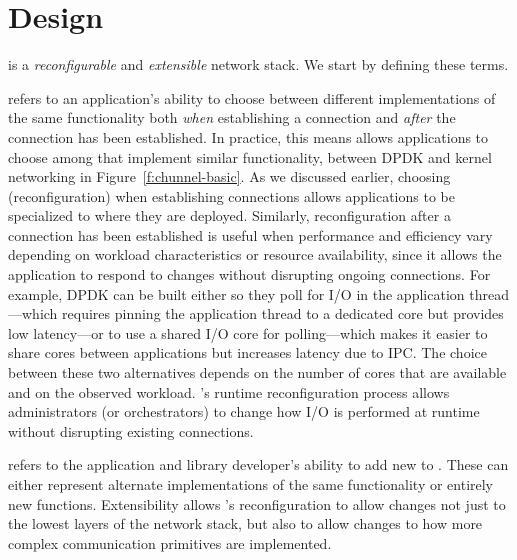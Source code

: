\section{\name Design}\label{sec:design}\label{s:design}
\name is a \emph{reconfigurable} and \emph{extensible} network stack. We start by defining these terms.

 refers to an application's ability to choose between different implementations of the same functionality both \emph{when} establishing a connection and \emph{after} the connection has been established. In practice, this means \name allows applications to choose among \tunnels that implement similar functionality, \eg between DPDK and kernel networking in Figure~\ref{f:chunnel-basic}. As we discussed earlier, choosing \tunnels (\ie reconfiguration) when establishing connections allows applications to be specialized to where they are deployed. Similarly, reconfiguration after a connection has been established is useful when \tunnel performance and efficiency vary depending on workload characteristics or resource availability, since it allows the application to respond to changes without disrupting ongoing connections. For example, DPDK \tunnels can be built either so they poll for I/O in the application thread---which requires pinning the application thread to a dedicated core but provides low latency---or to use a shared I/O core for polling---which makes it easier to share cores between applications but increases latency due to IPC. The choice between these two alternatives depends on the number of cores that are available and on the observed workload. \name's runtime reconfiguration process allows administrators (or orchestrators) to change how I/O is performed at runtime without disrupting existing connections.



 refers to the application and library developer's ability to add new \tunnels to \name. These \tunnels can either represent alternate implementations of the same functionality or entirely new functions. Extensibility allows \name's reconfiguration to allow changes not just to the lowest layers of the network stack, but also to allow changes to how more complex communication primitives are implemented.

